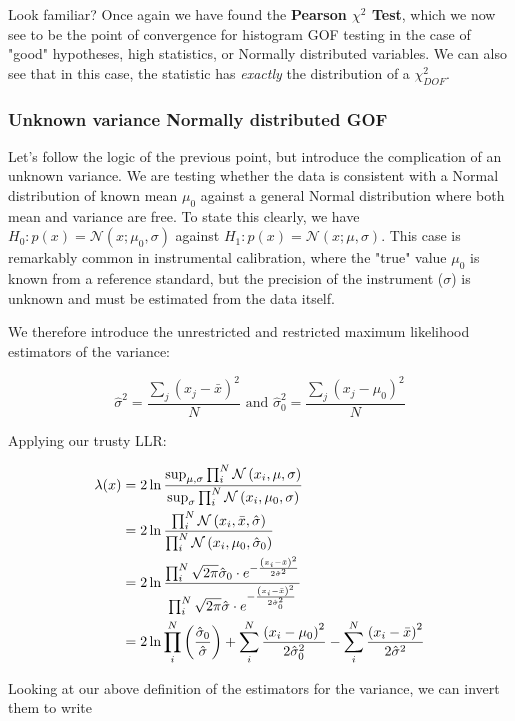 Look familiar? Once again we have found the \textbf{Pearson $\chi^2$ Test}, which we now see to be the point of convergence for histogram GOF testing in the case of "good" hypotheses, high statistics, or Normally distributed variables. We can also see that in this case, the statistic has \emph{exactly} the distribution of a $\chi^2_{DOF}$.

\subsubsection{Unknown variance Normally distributed GOF}
Let's follow the logic of the previous point, but introduce the complication of an unknown variance. We are testing whether the data is consistent with a Normal distribution of known mean $\mu_0$ against a general Normal distribution where both mean and variance are free. To state this clearly, we have $H_0: p(x) = \mathcal{N}(x;\mu_0, \sigma)$ against $H_1: p(x) = \mathcal{N}(x;\mu, \sigma)$. This case is remarkably common in instrumental calibration, where the "true" value $\mu_0$ is known from a reference standard, but the precision of the instrument ($\sigma$) is unknown and must be estimated from the data itself.

We therefore introduce the unrestricted and restricted maximum likelihood estimators of the variance:

	\[
	\hat{\sigma}^2 = \frac{\sum_j\left(x_j-\bar{x}\right)^2}{N}\text{ and } \hat{\sigma}_0^2 = \frac{\sum_j\left(x_j-\mu_0\right)^2}{N}
	\]

Applying our trusty LLR:

\begin{align*}
	\lambda(x) &= 2\ln \frac{\sup_{\mu,\sigma}\prod_i^N\mathcal{N}\left(x_i,\mu, \sigma\right)}{\sup_{\sigma}\prod_i^N\mathcal{N}\left(x_i,\mu_0, \sigma\right)} \\ 
	&= 2\ln \frac{\prod_i^N\mathcal{N}\left(x_i,\bar{x}, \hat\sigma\right)}{\prod_i^N\mathcal{N}\left(x_i,\mu_0, \hat{\sigma}_0\right)} \\ 
	&= 2\ln \frac{\prod_i^N\sqrt{2\pi}\hat{\sigma}_0 \cdot e^{-\frac{\left(x_i-\bar{x}\right)^2}{2\hat{\sigma}^2}}}{\prod_i^N\sqrt{2\pi}\hat{\sigma} \cdot e^{-\frac{\left(x_i-\bar{x}\right)^2}{2\hat{\sigma}_0^2}}} \\ 
	&= 2\ln\prod_i^N\left(\frac{\hat{\sigma}_0}{\hat{\sigma}}\right) + \sum_i^N\frac{\left(x_i-\mu_0\right)^2}{2\hat{\sigma}_0^2}-\sum_i^N\frac{\left(x_i-\bar{x}\right)^2}{2\hat{\sigma}^2}
\end{align*}

Looking at our above definition of the estimators for the variance, we can invert them to write 

